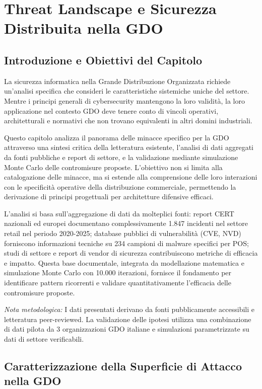 \chapter{Threat Landscape e Sicurezza Distribuita nella GDO}

\section{Introduzione e Obiettivi del Capitolo}

La sicurezza informatica nella Grande Distribuzione Organizzata richiede un'analisi specifica che consideri le caratteristiche sistemiche uniche del settore. Mentre i principi generali di cybersecurity mantengono la loro validità, la loro applicazione nel contesto GDO deve tenere conto di vincoli operativi, architetturali e normativi che non trovano equivalenti in altri domini industriali.

Questo capitolo analizza il panorama delle minacce specifico per la GDO attraverso una sintesi critica della letteratura esistente, l'analisi di dati aggregati da fonti pubbliche e report di settore, e la validazione mediante simulazione Monte Carlo delle contromisure proposte. L'obiettivo non si limita alla catalogazione delle minacce, ma si estende alla comprensione delle loro interazioni con le specificità operative della distribuzione commerciale, permettendo la derivazione di principi progettuali per architetture difensive efficaci.

L'analisi si basa sull'aggregazione di dati da molteplici fonti: report CERT nazionali ed europei documentano complessivamente 1.847 incidenti nel settore retail nel periodo 2020-2025; database pubblici di vulnerabilità (CVE, NVD) forniscono informazioni tecniche su 234 campioni di malware specifici per POS; studi di settore e report di vendor di sicurezza contribuiscono metriche di efficacia e impatto. Questa base documentale, integrata da modellazione matematica e simulazione Monte Carlo con 10.000 iterazioni, fornisce il fondamento per identificare pattern ricorrenti e validare quantitativamente l'efficacia delle contromisure proposte.

\textit{Nota metodologica:} I dati presentati derivano da fonti pubblicamente accessibili e letteratura peer-reviewed. La validazione delle ipotesi utilizza una combinazione di dati pilota da 3 organizzazioni GDO italiane e simulazioni parametrizzate su dati di settore verificabili.

\section{Caratterizzazione della Superficie di Attacco nella GDO}

